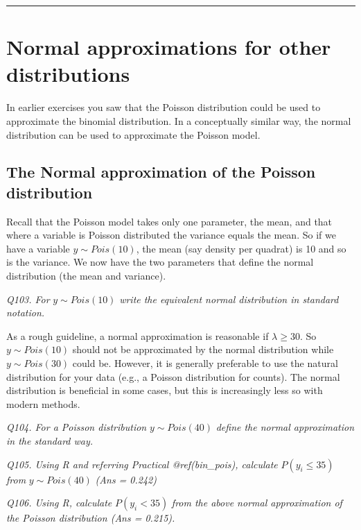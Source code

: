 \documentclass[
  11pt,
  a4paper,
]{book}
\begin{document}
\begin{center}\rule{0.5\linewidth}{0.5pt}\end{center}

\hypertarget{normal-approximations-for-other-distributions}{%
\section{Normal approximations for other distributions}\label{normal-approximations-for-other-distributions}}

In earlier exercises you saw that the Poisson distribution could be used to approximate the binomial distribution. In a conceptually similar way, the normal distribution can be used to approximate the Poisson model.

\hypertarget{the-normal-approximation-of-the-poisson-distribution}{%
\subsection{The Normal approximation of the Poisson distribution}\label{the-normal-approximation-of-the-poisson-distribution}}

Recall that the Poisson model takes only one parameter, the mean, and that where a variable is Poisson distributed the variance equals the mean. So if we have a variable \(y \sim Pois(10)\), the mean (say density per quadrat) is 10 and so is the variance. We now have the two parameters that define the normal distribution (the mean and variance).

\emph{Q103. For} \(y \sim Pois(10)\) \emph{write the equivalent normal distribution in standard notation.}

As a rough guideline, a normal approximation is reasonable if \(\lambda \geq 30\). So \(y \sim Pois(10)\) should not be approximated by the normal distribution while \(y \sim Pois(30)\) could be. However, it is generally preferable to use the natural distribution for your data (e.g., a Poisson distribution for counts). The normal distribution is beneficial in some cases, but this is increasingly less so with modern methods.

\emph{Q104. For a Poisson distribution} \(y \sim Pois(40)\) \emph{define the normal approximation in the standard way.}

\emph{Q105. Using R and referring Practical @ref(bin\_pois), calculate} \(P(y_i \leq 35)\) \emph{from} \(y \sim Pois(40)\) \emph{(Ans = 0.242)}

\emph{Q106. Using R, calculate} \(P(y_i < 35)\) \emph{from the above normal approximation of the Poisson distribution (Ans = 0.215).}
\end{document}
